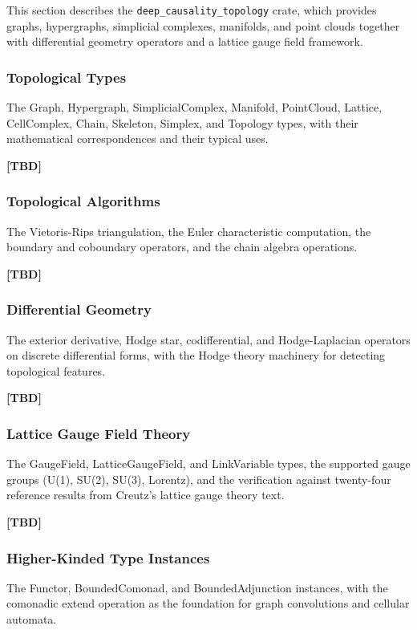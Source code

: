 This section describes the \texttt{deep\_causality\_topology} crate, which provides graphs, hypergraphs, simplicial complexes, manifolds, and point clouds together with differential geometry operators and a lattice gauge field framework.
 
\subsubsection{Topological Types}
The Graph, Hypergraph, SimplicialComplex, Manifold, PointCloud, Lattice, CellComplex, Chain, Skeleton, Simplex, and Topology types, with their mathematical correspondences and their typical uses.
 
\textbf{[TBD]}
 
\subsubsection{Topological Algorithms}
The Vietoris-Rips triangulation, the Euler characteristic computation, the boundary and coboundary operators, and the chain algebra operations.
 
\textbf{[TBD]}
 
\subsubsection{Differential Geometry}
The exterior derivative, Hodge star, codifferential, and Hodge-Laplacian operators on discrete differential forms, with the Hodge theory machinery for detecting topological features.
 
\textbf{[TBD]}
 
\subsubsection{Lattice Gauge Field Theory}
The GaugeField, LatticeGaugeField, and LinkVariable types, the supported gauge groups (U(1), SU(2), SU(3), Lorentz), and the verification against twenty-four reference results from Creutz's lattice gauge theory text.
 
\textbf{[TBD]}
 
\subsubsection{Higher-Kinded Type Instances}
The Functor, BoundedComonad, and BoundedAdjunction instances, with the comonadic extend operation as the foundation for graph convolutions and cellular automata.
 
